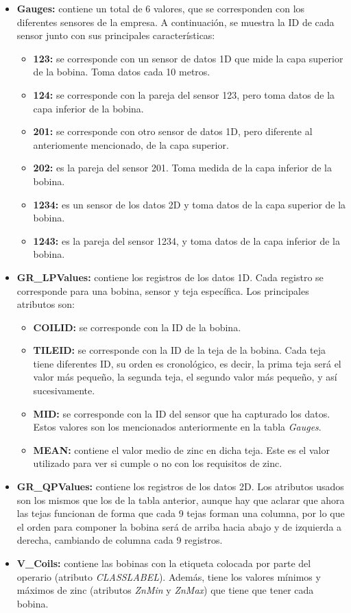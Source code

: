 \begin{itemize}
    \item \textbf{Gauges:} contiene un total de 6 valores, que se corresponden con los diferentes sensores de la empresa. A continuación, se muestra la ID de cada sensor junto con sus principales características:
        \begin{itemize}
        \item \textbf{123:} se corresponde con un sensor de datos 1D que mide la capa superior de la bobina. Toma datos cada 10 metros.
        \item \textbf{124:} se corresponde con la pareja del sensor 123, pero toma datos de la capa inferior de la bobina.
        \item \textbf{201:} se corresponde con otro sensor de datos 1D, pero diferente al anteriomente mencionado, de la capa superior.
        \item \textbf{202:} es la pareja del sensor 201. Toma medida de la capa inferior de la bobina.
        \item \textbf{1234:} es un sensor de los datos 2D y toma datos de la capa superior de la bobina.
        \item \textbf{1243:} es la pareja del sensor 1234, y toma datos de la capa inferior de la bobina.
        \end{itemize}
    \item \textbf{GR\_LPValues:} contiene los registros de los datos 1D. Cada registro se corresponde para una bobina, sensor y teja específica. Los principales atributos son:
    \begin{itemize}
        \item \textbf{COILID:} se corresponde con la ID de la bobina.
        \item \textbf{TILEID:} se corresponde con la ID de la teja de la bobina. Cada teja tiene diferentes ID, su orden es cronológico, es decir, la prima teja será el valor más pequeño, la segunda teja, el segundo valor más pequeño, y así sucesivamente.
        \item \textbf{MID:} se corresponde con la ID del sensor que ha capturado los datos. Estos valores son los mencionados anteriormente en la tabla \emph{Gauges}.
        \item \textbf{MEAN:} contiene el valor medio de zinc en dicha teja. Este es el valor utilizado para ver si cumple o no con los requisitos de zinc.
    \end{itemize}
    \item  \textbf{GR\_QPValues:} contiene los registros de los datos 2D. Los atributos usados son los mismos que los de la tabla anterior, aunque hay que aclarar que ahora las tejas funcionan de forma que cada 9 tejas forman una columna, por lo que el orden para componer la bobina será de arriba hacia abajo y de izquierda a derecha, cambiando de columna cada 9 registros.
    \item  \textbf{V\_Coils:} contiene las bobinas con la etiqueta colocada por parte del operario (atributo \emph{CLASSLABEL}). Además, tiene los valores mínimos y máximos de zinc (atributos \emph{ZnMin} y \emph{ZnMax}) que tiene que tener cada bobina.
\end{itemize}

